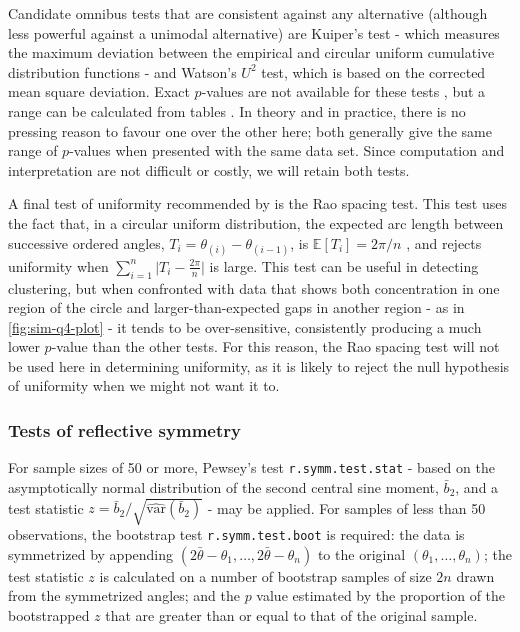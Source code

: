 \documentclass[../../ArchStats.tex]{subfiles}
\begin{document}
Candidate omnibus tests that are consistent against any alternative (although less powerful against a unimodal alternative) are Kuiper's test - which measures the maximum deviation between the empirical and circular uniform cumulative distribution functions - and Watson's $U^2$ test, which is based on the corrected mean square deviation. Exact $p$-values are not available for these tests , but a range can be calculated from tables . In theory and in practice, there is no pressing reason to favour one over the other here; both generally give the same range of $p$-values when presented with the same data set. Since computation and interpretation are not difficult or costly, we will retain both tests.

A final test of uniformity recommended by \cite{Pewsey2014} is the Rao spacing test. This test uses the fact that, in a circular uniform distribution, the expected arc length between successive ordered angles, $T_i = \theta_{(i)} - \theta_{(i-1)}$, is 
$\mathbb{E}\left[T_i\right] = 2\pi/n$ , and rejects uniformity when $\sum_{i=1}^n \vert T_i - \frac{2\pi}{n}\vert$ is large. This test can be useful in detecting clustering, but when confronted with data that shows both concentration in one region of the circle and larger-than-expected gaps in another region - as in \ref{fig:sim-q4-plot} - it tends to be over-sensitive, consistently producing a much lower $p$-value than the other tests. For this reason, the Rao spacing test will not be used here in determining uniformity, as it is likely to reject the null hypothesis of uniformity when we might not want it to. 


\subsubsection{Tests of reflective symmetry}
\label{sec:refl-symmetry}

For sample sizes of 50 or more, Pewsey's test \texttt{r.symm.test.stat} - based on the asymptotically normal distribution of the second central sine moment, $\bar{b}_2$, and a test statistic $z = \bar{b}_2 / \sqrt{\widehat{\text{var}}(\bar{b}_2)}$ \cite{Pewsey2002} - may be applied. For samples of less than 50 observations, the bootstrap test \texttt{r.symm.test.boot} is required: the data is symmetrized by appending $(2\bar{\theta} - \theta_1, \dots, 2\bar{\theta} - \theta_n)$ to the original $(\theta_1, \dots, \theta_n)$; the test statistic $z$ is calculated on a number of bootstrap samples of size $2n$ drawn from the symmetrized angles; and the $p$ value estimated by the proportion of the bootstrapped $z$ that are greater than or equal to that of the original sample.
\end{document}
